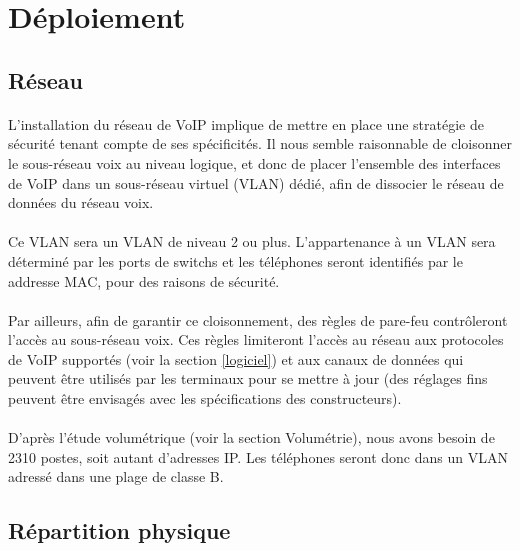 \section{Déploiement}

\subsection{Réseau}

\paragraph{} L'installation du réseau de VoIP implique de mettre en place une
stratégie de sécurité tenant compte de ses spécificités. Il nous semble
raisonnable de cloisonner le sous-réseau voix au niveau logique, et donc de
placer l'ensemble des interfaces de VoIP dans un sous-réseau virtuel (VLAN)
dédié, afin de dissocier le réseau de données du réseau voix.

\paragraph{} Ce VLAN sera un VLAN de niveau 2 ou plus. L'appartenance à un VLAN
sera déterminé par les ports de switchs et les téléphones seront identifiés par
le addresse MAC, pour des raisons de sécurité.

\paragraph{} Par ailleurs, afin de garantir ce cloisonnement, des règles de
pare-feu contrôleront l'accès au sous-réseau voix. Ces règles limiteront
l'accès au réseau aux protocoles de VoIP supportés (voir la section
\ref{logiciel}) et aux canaux de données qui peuvent être utilisés par les
terminaux pour se mettre à jour (des réglages fins peuvent être envisagés avec
les spécifications des constructeurs).

\paragraph{} D'après l'étude volumétrique (voir la section Volumétrie), nous avons
besoin de 2310 postes, soit autant d'adresses IP. Les téléphones seront donc
dans un VLAN adressé dans une plage de classe B.

\subsection{Répartition physique}

